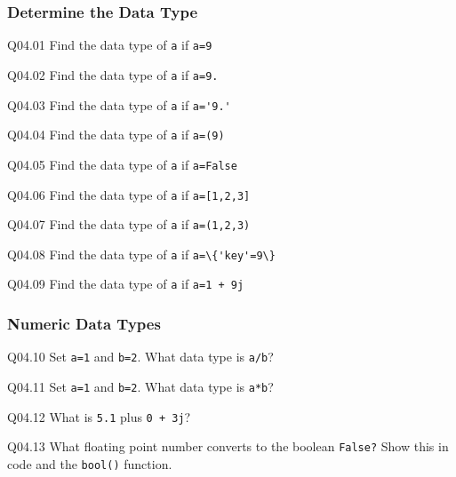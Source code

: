 \documentclass{book}
\newenvironment{problems}{}{}  %
\newcommand{\passthrough}[1]{#1}
\begin{document}
    
        \begin{problems}
        \hypertarget{determine-the-data-type}{%
\subsubsection{Determine the Data Type}\label{determine-the-data-type}}

Q04.01 Find the data type of \passthrough{\lstinline!a!} if
\passthrough{\lstinline!a=9!}

Q04.02 Find the data type of \passthrough{\lstinline!a!} if
\passthrough{\lstinline!a=9.!}

Q04.03 Find the data type of \passthrough{\lstinline!a!} if
\passthrough{\lstinline!a='9.'!}

Q04.04 Find the data type of \passthrough{\lstinline!a!} if
\passthrough{\lstinline!a=(9)!}

Q04.05 Find the data type of \passthrough{\lstinline!a!} if
\passthrough{\lstinline!a=False!}

Q04.06 Find the data type of \passthrough{\lstinline!a!} if
\passthrough{\lstinline!a=[1,2,3]!}

Q04.07 Find the data type of \passthrough{\lstinline!a!} if
\passthrough{\lstinline!a=(1,2,3)!}

Q04.08 Find the data type of \passthrough{\lstinline!a!} if
\passthrough{\lstinline!a=\{'key'=9\}!}

Q04.09 Find the data type of \passthrough{\lstinline!a!} if
\passthrough{\lstinline!a=1 + 9j!}
        \end{problems}

    




    
        \hypertarget{numeric-data-types}{%
\subsubsection{Numeric Data Types}\label{numeric-data-types}}

Q04.10 Set \passthrough{\lstinline!a=1!} and
\passthrough{\lstinline!b=2!}. What data type is
\passthrough{\lstinline!a/b!}?

Q04.11 Set \passthrough{\lstinline!a=1!} and
\passthrough{\lstinline!b=2!}. What data type is
\passthrough{\lstinline!a*b!}?

Q04.12 What is \passthrough{\lstinline!5.1!} plus
\passthrough{\lstinline!0 + 3j!}?

Q04.13 What floating point number converts to the boolean
\passthrough{\lstinline!False?!} Show this in code and the
\passthrough{\lstinline!bool()!} function.
\end{document}
